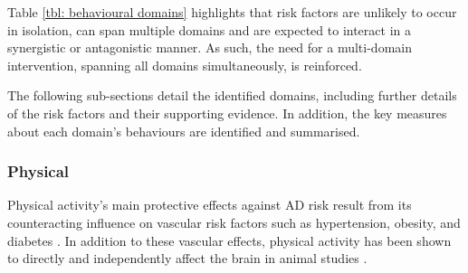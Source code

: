 \begin{table}[h]
\centering
\caption{Behavioural domains and AD related risk factors.}
\label{tbl: behavioural domains}
\end{table}

Table \ref{tbl: behavioural domains} highlights that risk factors are unlikely to occur in isolation, can span multiple domains and are expected to interact in a synergistic or antagonistic manner. As such, the need for a multi-domain intervention, spanning all domains simultaneously, is reinforced.

The following sub-sections detail the identified domains, including further details of the risk factors and their supporting evidence. In addition, the key measures about each domain's behaviours are identified and summarised.

\subsubsection{Physical}
Physical activity's main protective effects against AD risk result from its counteracting influence on vascular risk factors such as hypertension, obesity, and diabetes \cite{Hughes2010,Angevaren2010}.
In addition to these vascular effects, physical activity has been shown to directly and independently affect the brain in animal studies \cite{Voss2013}.

